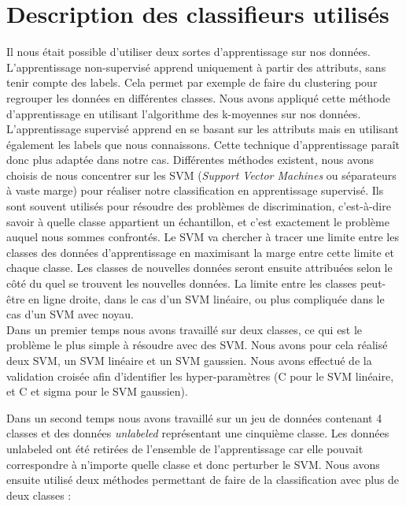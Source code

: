 \section{Description des classifieurs utilisés}

	Il nous était possible d'utiliser deux sortes d'apprentissage sur nos données. L'apprentissage non-supervisé apprend uniquement à partir des attributs, sans tenir compte des labels. Cela permet par exemple de faire du clustering pour regrouper les données en différentes classes. Nous avons appliqué cette méthode d'apprentissage en utilisant l'algorithme des k-moyennes sur nos données.\\

	L'apprentissage supervisé apprend en se basant sur les attributs mais en utilisant également les labels que nous connaissons. Cette technique d'apprentissage paraît donc plus adaptée dans notre cas. Différentes méthodes existent, nous avons choisis de nous concentrer sur les SVM (\emph{Support Vector Machines} ou séparateurs à vaste marge) pour réaliser notre classification en apprentissage supervisé. Ils sont souvent utilisés pour résoudre des problèmes de discrimination, c'est-à-dire savoir à quelle classe appartient un échantillon, et c'est exactement le problème auquel nous sommes confrontés. Le SVM va chercher à tracer une limite entre les classes des données d'apprentissage en maximisant la marge entre cette limite et chaque classe. Les classes de nouvelles données seront ensuite attribuées selon le côté du quel se trouvent les nouvelles données. La limite entre les classes peut-être en ligne droite, dans le cas d'un SVM linéaire, ou plus compliquée dans le cas d'un SVM avec noyau.\\

	Dans un premier temps nous avons travaillé sur deux classes, ce qui est le problème le plus simple à résoudre avec des SVM. Nous avons pour cela réalisé deux SVM, un SVM linéaire et un SVM gaussien. Nous avons effectué de la validation croisée afin d'identifier les hyper-paramètres (C pour le SVM linéaire, et C et sigma pour le SVM gaussien).

	Dans un second temps nous avons travaillé sur un jeu de données contenant 4 classes et des données \emph{unlabeled} représentant une cinquième classe. Les données unlabeled ont été retirées de l'ensemble de l'apprentissage car elle pouvait correspondre à n'importe quelle classe et donc perturber le SVM.
	Nous avons ensuite utilisé deux méthodes permettant de faire de la classification avec plus de deux classes :


